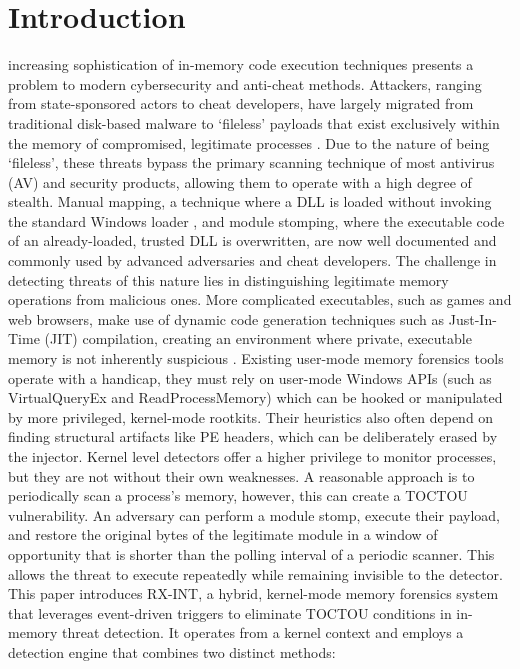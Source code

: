 \documentclass[journal]{IEEEtran}
\begin{document}
\section{Introduction}
 increasing sophistication of in-memory code execution techniques presents a problem to modern cybersecurity and anti-cheat methods. Attackers, ranging from state-sponsored actors to cheat developers, have largely migrated from traditional disk-based malware to `fileless' payloads that exist exclusively within the memory of compromised, legitimate processes \cite{crowdstrike2024gtr} \cite{mandiant2024mtrends}. Due to the nature of being `fileless', these threats bypass the primary scanning technique of most antivirus (AV) and security products, allowing them to operate with a high degree of stealth. Manual mapping, a technique where a DLL is loaded without invoking the standard Windows loader \cite{fewer2008reflective}, and module stomping, where the executable code of an already-loaded, trusted DLL is overwritten, are now well documented and commonly used by advanced adversaries and cheat developers.
The challenge in detecting threats of this nature lies in distinguishing legitimate memory operations from malicious ones. More complicated executables, such as games and web browsers, make use of dynamic code generation techniques such as Just-In-Time (JIT) compilation, creating an environment where private, executable memory is not inherently suspicious \cite{chromiumV8Jit}. Existing user-mode memory forensics tools operate with a handicap, they must rely on user-mode Windows APIs (such as VirtualQueryEx and ReadProcessMemory) which can be hooked or manipulated by more privileged, kernel-mode rootkits. Their heuristics also often depend on finding structural artifacts like PE headers, which can be deliberately erased by the injector.
Kernel level detectors offer a higher privilege to monitor processes, but they are not without their own weaknesses. A reasonable approach is to periodically scan a process's memory, however, this can create a TOCTOU vulnerability. An adversary can perform a module stomp, execute their payload, and restore the original bytes of the legitimate module in a window of opportunity that is shorter than the polling interval of a periodic scanner. This allows the threat to execute repeatedly while remaining invisible to the detector.
This paper introduces RX-INT, a hybrid, kernel-mode memory forensics system that leverages event-driven triggers to eliminate TOCTOU conditions in in-memory threat detection. It operates from a kernel context and employs a detection engine that combines two distinct methods:
\end{document}
